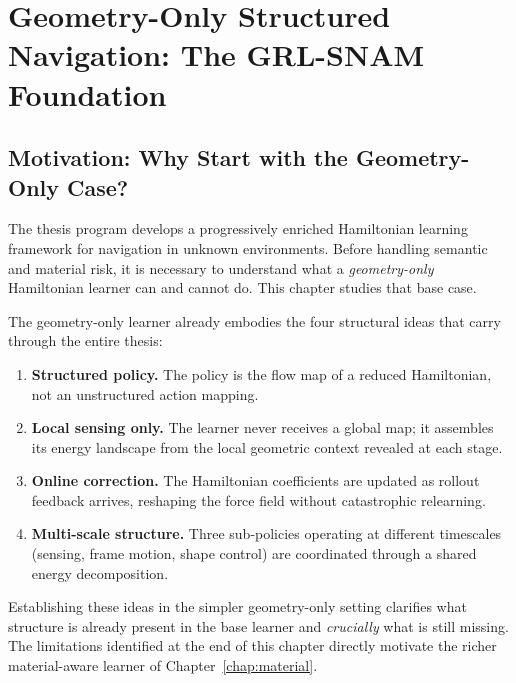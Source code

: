 
\chapter{Geometry-Only Structured Navigation: The GRL-SNAM Foundation}
\label{chap:grlsnam}

\providecommand{\Ham}{\mathcal{H}}
\providecommand{\Potential}{\mathcal{R}}
\providecommand{\PhaseState}{z}
\providecommand{\Pos}{q}
\providecommand{\Mom}{p}
\providecommand{\Mass}{\mathrm{M}}
\providecommand{\J}{\mathbb{J}}

\section{Motivation: Why Start with the Geometry-Only Case?}
\label{sec:ch3:motivation}

The thesis program develops a progressively enriched Hamiltonian learning
framework for navigation in unknown environments.
Before handling semantic and material risk, it is necessary to understand
what a \emph{geometry-only} Hamiltonian learner can and cannot do.
This chapter studies that base case.

The geometry-only learner already embodies the four structural ideas that
carry through the entire thesis:
\begin{enumerate}
  \item \textbf{Structured policy.}
        The policy is the flow map of a reduced Hamiltonian, not an
        unstructured action mapping.
  \item \textbf{Local sensing only.}
        The learner never receives a global map; it assembles its energy
        landscape from the local geometric context revealed at each stage.
  \item \textbf{Online correction.}
        The Hamiltonian coefficients are updated as rollout feedback
        arrives, reshaping the force field without catastrophic relearning.
  \item \textbf{Multi-scale structure.}
        Three sub-policies operating at different timescales (sensing,
        frame motion, shape control) are coordinated through a shared
        energy decomposition.
\end{enumerate}
Establishing these ideas in the simpler geometry-only setting clarifies
what structure is already present in the base learner and \textit{crucially} what
is still missing.
The limitations identified at the end of this chapter directly motivate
the richer material-aware learner of Chapter~\ref{chap:material}.

